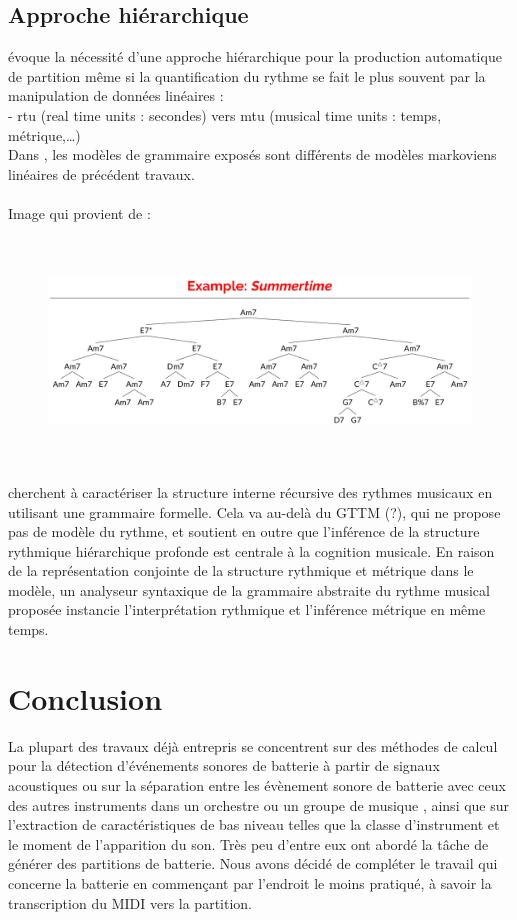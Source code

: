 \subsection{Approche hiérarchique}
\cite{foscarin:hal-01988990} évoque la nécessité d’une approche hiérarchique pour la production automatique de partition même si la quantification du rythme se fait le plus souvent par la manipulation de données linéaires :\\
- rtu (real time units : secondes) vers mtu (musical time units : temps, métrique,…)\\
Dans \cite{foscarin:hal-01988990}, les modèles de grammaire exposés sont différents de modèles markoviens linéaires de précédent travaux.\\\\
Image qui provient de \cite{harasimjazz} :\\
\begin{figure}[h]
	\centering
	\includegraphics[height=60mm, width=125mm]{z_images/2_etat_de_l_art/summertime_tree.png}
\end{figure}

\cite{rohrmeier2020towards} cherchent à caractériser la structure interne récursive des rythmes musicaux en utilisant une grammaire formelle.
Cela va au-delà du GTTM (?), qui ne propose pas de modèle du rythme, et soutient en outre que l'inférence de la structure rythmique hiérarchique profonde est centrale à la cognition musicale. En raison de la représentation conjointe de la structure rythmique et métrique dans le modèle, un analyseur syntaxique de la grammaire abstraite du rythme musical proposée instancie l'interprétation rythmique et l'inférence métrique en même temps.
\section*{Conclusion}
La plupart des travaux déjà entrepris se concentrent sur des méthodes de calcul pour la détection d'événements sonores de batterie à partir de signaux acoustiques ou sur la séparation entre les évènement sonore de batterie avec ceux des autres instruments dans un orchestre ou un groupe de musique \cite{2802}, ainsi que sur l'extraction de caractéristiques de bas niveau telles que la classe d'instrument et le moment de l'apparition du son. Très peu d'entre eux ont abordé la tâche de générer des partitions de batterie.
Nous avons décidé de compléter le travail qui concerne la batterie en commençant par l’endroit le moins pratiqué, à savoir la transcription du MIDI vers la partition.